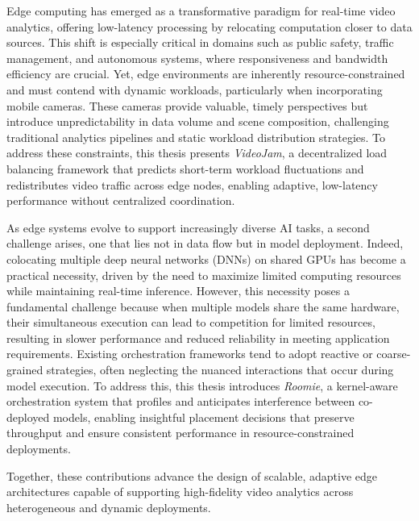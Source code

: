 


Edge computing has emerged as a transformative paradigm for real-time video analytics, offering low-latency processing by relocating computation closer to data sources. This shift is especially critical in domains such as public safety, traffic management, and autonomous systems, where responsiveness and bandwidth efficiency are crucial. Yet, edge environments are inherently resource-constrained and must contend with dynamic workloads, particularly when incorporating mobile cameras. These cameras provide valuable, timely perspectives but introduce unpredictability in data volume and scene composition, challenging traditional analytics pipelines and static workload distribution strategies. To address these constraints, this thesis presents \textit{VideoJam}, a decentralized load balancing framework that predicts short-term workload fluctuations and redistributes video traffic across edge nodes, enabling adaptive, low-latency performance without centralized coordination.

As edge systems evolve to support increasingly diverse AI tasks, a second challenge arises, one that lies not in data flow but in model deployment. Indeed, colocating multiple deep neural networks (DNNs) on shared GPUs has become a practical necessity, driven by the need to maximize limited computing resources while maintaining real-time inference. However, this necessity poses a fundamental challenge because when multiple models share the same hardware, their simultaneous execution can lead to competition for limited resources, resulting in slower performance and reduced reliability in meeting application requirements. Existing orchestration frameworks tend to adopt reactive or coarse-grained strategies, often neglecting the nuanced interactions that occur during model execution. To address this, this thesis introduces \textit{Roomie}, a kernel-aware orchestration system that profiles and anticipates interference between co-deployed models, enabling insightful placement decisions that preserve throughput and ensure consistent performance in resource-constrained deployments.

Together, these contributions advance the design of scalable, adaptive edge architectures capable of supporting high-fidelity video analytics across heterogeneous and dynamic deployments.
